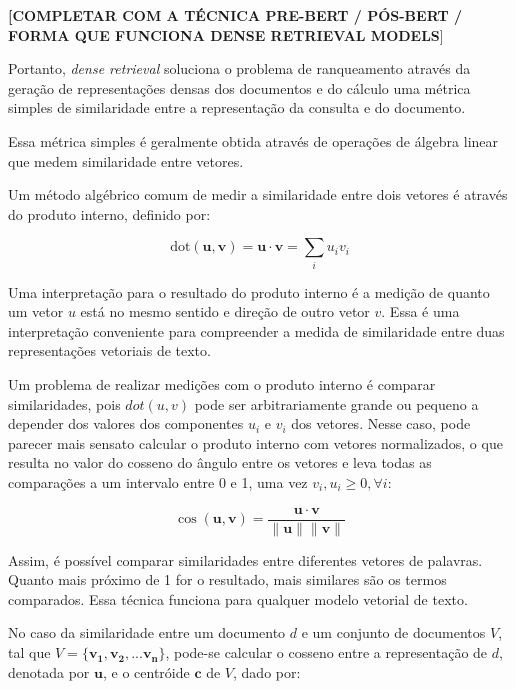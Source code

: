 \documentclass[
	12pt,				%
	openright,			%
	oneside,			%
	a4paper,			%
	english,			%
	french,				%
	spanish,			%
	brazil				%
	]{abntex2}
\begin{document}
\textbf{[COMPLETAR COM A TÉCNICA PRE-BERT / PÓS-BERT / FORMA QUE FUNCIONA DENSE RETRIEVAL MODELS}]

Portanto, \textit{dense retrieval} soluciona o problema de ranqueamento através da geração de representações densas dos documentos e do cálculo uma métrica simples de similaridade entre a representação da consulta e do documento.

Essa métrica simples é geralmente obtida através de operações de álgebra linear que medem similaridade entre vetores.

Um método algébrico comum de medir a similaridade entre dois vetores é através do produto interno, definido por:

\begin{equation}
\text{dot}(\mathbf{u}, \mathbf{v})  = \mathbf{u} \cdot \mathbf{v} = \sum_{i}u_{i}v_{i}
\label{eq:dot_product}
\end{equation}

Uma interpretação para o resultado do produto interno é a medição de quanto um vetor $u$ está no mesmo sentido e direção de outro vetor $v$. Essa é uma interpretação conveniente para compreender a medida de similaridade entre duas representações vetoriais de texto.

Um problema de realizar medições com o produto interno é comparar similaridades, pois $dot(u,v)$ pode ser arbitrariamente grande ou pequeno a depender dos valores dos componentes $u_i$ e $v_i$ dos vetores. Nesse caso, pode parecer mais sensato calcular o produto interno com vetores normalizados, o que resulta no valor do cosseno do ângulo entre os vetores e leva todas as comparações
a um intervalo entre 0 e 1, uma vez $v_i, u_i \geq 0, \forall i$:

\begin{equation}
\cos (\mathbf{u}, \mathbf{v})  = \frac{\mathbf{u} \cdot \mathbf{v}}{\|\mathbf{u}\| \|\mathbf{v}\|}
\label{eq:cosine_similarity}
\end{equation}

Assim, é possível comparar similaridades entre diferentes vetores de palavras.
Quanto mais próximo de 1 for o resultado, mais similares são os termos comparados.
Essa técnica funciona para qualquer modelo vetorial de texto.

No caso da similaridade entre um documento $d$ e um conjunto de documentos $V$, tal que $V = \{\mathbf{v_1}, \mathbf{v_2}, ... \mathbf{v_n}\}$,
pode-se calcular o cosseno entre a representação de $d$, denotada por $\mathbf{u}$, e o centróide $\mathbf{c}$ de $V$, dado por:
\end{document}
